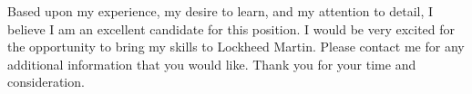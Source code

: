 \documentclass[11pt,a4paper,roman]{moderncv}        %
\begin{document}
Based upon my experience, my desire to learn, and my attention to detail, I believe I am an excellent candidate for this position. I would be very excited for the opportunity to bring my skills to Lockheed Martin. Please contact me for any additional information that you would like. Thank you for your time and consideration.



\makeletterclosing
\end{document}
